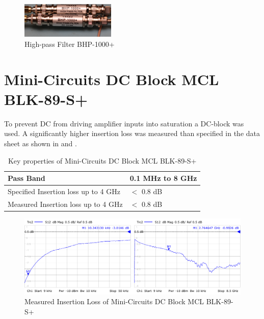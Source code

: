 \begin{figure}[p]
  \centering
  \includegraphics[width=0.4\textwidth]{pictures/BHP-1000+}
  \caption{High-pass Filter BHP-1000+}
  \label{fig:comp_bhp1000_pic}
\end{figure}

\section{Mini-Circuits DC Block MCL BLK-89-S+}
\label{sec:comp_dc_block}
To prevent \gls{DC} from driving amplifier inputs into saturation
a \gls{DC}-block was used. A significantly higher insertion loss was
measured than specified in the data sheet as shown in
 and .

\begin{table}[h]
  \centering
  \begin{tabular}{|l|l|}
    \hline
    Pass Band & 0.1 MHz to 8 GHz \\ \hline
    Specified Insertion loss up to 4 GHz & $<$ 0.8 dB \\ \hline
    Measured Insertion loss up to 4 GHz & $<$ 0.8 dB \\ \hline
  \end{tabular}
  \caption{Key properties of Mini-Circuits DC Block MCL BLK-89-S+ \cite{mc_blk89}}
  \label{tab:comp_dc_block}
\end{table}

\begin{figure}[p]
  \centering
  \includegraphics[width=\textwidth]{figures/network_analyzer/MCL_BLK-89-S+_DC-Block_insertion_loss}
  \caption{Measured Insertion Loss of Mini-Circuits DC Block MCL BLK-89-S+}
  \label{fig:comp_dc_block_insertion_loss}
\end{figure}


